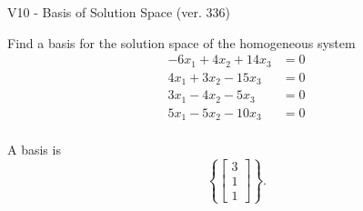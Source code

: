 \begin{exercise}
  \begin{exerciseTitle}V10 - Basis of Solution Space (ver. 336)\end{exerciseTitle}
  \begin{exerciseStatement}
    Find a basis for the solution space of the homogeneous system 
\begin{align*}
 -6 x_ 1 + 4 x_ 2 + 14 x_ 3 &= 0  \\ 
  4 x_ 1 + 3 x_ 2 -15 x_ 3 &= 0  \\ 
  3 x_ 1 -4 x_ 2 -5 x_ 3 &= 0  \\ 
  5 x_ 1 -5 x_ 2 -10 x_ 3 &= 0  \\ 
 \end{align*}


 
  \end{exerciseStatement}

  \begin{exerciseAnswer}
   A basis is   
\[\left\{\left[\begin{array}{c}
3 \\
1 \\
1
\end{array}\right]\right\}.\]

  


  \end{exerciseAnswer}
\end{exercise}
